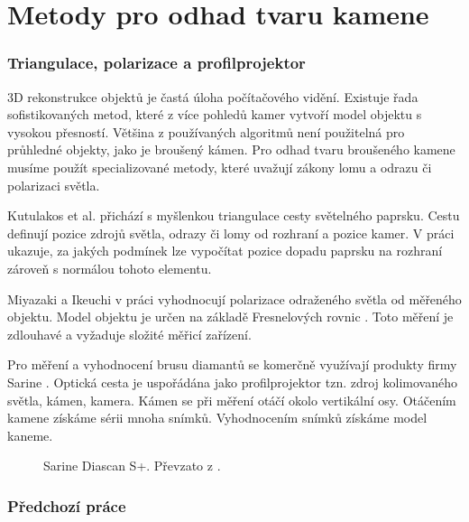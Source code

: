 \part{Metody pro odhad tvaru kamene}

\section{Triangulace, polarizace a profilprojektor}
	3D rekonstrukce objektů je častá úloha počítačového vidění. Existuje řada sofistikovaných metod, které z více pohledů kamer vytvoří model objektu s vysokou přesností. Většina z používaných algoritmů není použitelná pro průhledné objekty, jako je broušený kámen. Pro odhad tvaru broušeného kamene musíme použít specializované metody, které uvažují zákony lomu a odrazu či polarizaci světla. 
	
	Kutulakos et al. \cite{Kutulakos2008} přichází s myšlenkou triangulace cesty světelného paprsku. Cestu definují pozice zdrojů světla, odrazy či lomy od rozhraní a pozice kamer. V práci \cite{Kutulakos2008} ukazuje, za jakých podmínek lze vypočítat pozice dopadu paprsku na rozhraní zároveň s normálou tohoto elementu. 
	 
	 Miyazaki a Ikeuchi v práci \cite{PolarTrace} vyhodnocují polarizace odraženého světla od měřeného objektu. Model objektu je určen na základě Fresnelových rovnic \cite{Handbook}. Toto měření je zdlouhavé a vyžaduje složité měřicí zařízení.    


  Pro měření a vyhodnocení brusu diamantů se komerčně využívají produkty firmy Sarine \cite{Sarine}. Optická cesta je uspořádána jako profilprojektor tzn. zdroj kolimovaného světla, kámen, kamera. Kámen se při měření otáčí okolo vertikální osy. Otáčením kamene získáme sérii mnoha snímků. Vyhodnocením snímků získáme model kaneme. 
\begin{figure}[h!]
     \centering 

\caption[Sarine Diascan S+.]{Sarine Diascan S+. Převzato z \cite{DiaScan}.}

\label{fig:histogram relativni pohyb }

\end{figure}
  
\newpage
\section{Předchozí práce}

